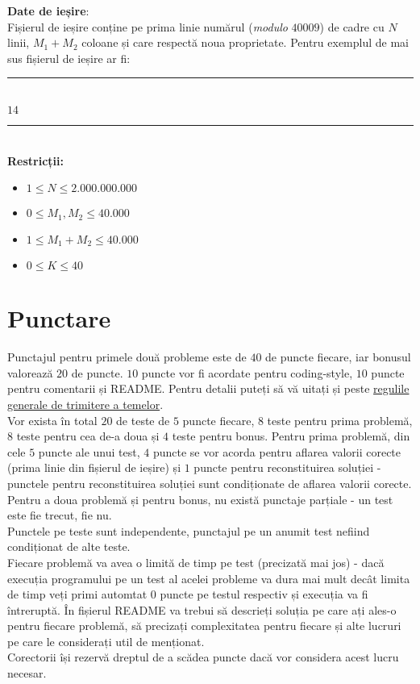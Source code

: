 \documentclass[a4paper,5pt]{article}
\begin{document}
\textbf{Date de ieșire}: \\
Fișierul de ieșire conține pe prima linie numărul (\textit{modulo} $40009$) de
cadre cu $N$ linii, $M_1 + M_2$ coloane și care respectă noua proprietate.
Pentru exemplul de mai sus fișierul de ieșire ar fi:\\
\rule{50mm}{0.1mm}\\
\noindent
$14$\\
\rule{50mm}{0.1mm}\\

\textbf{Restricții:}
\begin{itemize}
\item $1 \le N \le 2.000.000.000$
\item $0 \le M_1, M_2 \le 40.000$
\item $1 \le M_1 + M_2 \le 40.000$
\item $0 \le K \le 40$
\end{itemize}

\section{Punctare}
Punctajul pentru primele două probleme este de $40$ de puncte fiecare, iar
bonusul valorează $20$ de puncte. $10$ puncte vor fi acordate pentru
coding-style, $10$ puncte pentru comentarii și README. Pentru detalii puteți să
vă uitați și peste
\href{http://ocw.cs.pub.ro/courses/pa/regulament-general#teme}{regulile
  generale de trimitere a temelor}.\\
Vor exista în total $20$ de teste de $5$ puncte fiecare, $8$ teste pentru
prima problemă, $8$ teste pentru cea de-a doua
și $4$ teste pentru bonus. Pentru prima problemă, din cele $5$ puncte ale unui test,
$4$ puncte se vor acorda pentru aflarea valorii corecte (prima linie din fișierul de ieșire) și
$1$ puncte pentru reconstituirea soluției - punctele pentru reconstituirea
soluției sunt condiționate de aflarea valorii corecte. Pentru a doua problemă și
pentru bonus, nu există punctaje parțiale - un test este fie trecut, fie nu.\\
Punctele pe teste sunt independente, punctajul pe un anumit test nefiind
condiționat de alte teste.\\
Fiecare problemă va avea o limită de timp pe test (precizată mai jos) - dacă 
execuția programului pe un test al acelei probleme va dura mai mult decât
limita de timp veți primi automtat $0$ puncte pe testul respectiv și execuția
va fi întreruptă.
În fișierul README va trebui să descrieți soluția pe care ați ales-o pentru
fiecare problemă, să precizați complexitatea pentru fiecare și alte lucruri pe
care le considerați util de menționat.\\
Corectorii își rezervă dreptul de a scădea puncte dacă vor considera acest
lucru necesar.
\end{document}
